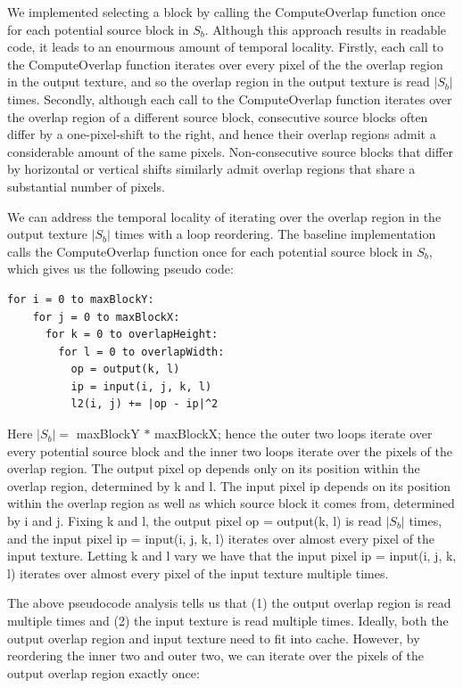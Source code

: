 \documentclass[letterpaper]{article}
\newcommand{\inline}[1]{{\ttfamily\hyphenchar\font=45 #1}}
\begin{document}
We implemented selecting a block by calling the \inline{ComputeOverlap} function once for each potential source block in $S_b$. Although this approach results in readable code, it leads to an enourmous amount of temporal locality. Firstly, each call to the \inline{ComputeOverlap} function iterates over every pixel of the the overlap region in the output texture, and so the overlap region in the output texture is read $|S_b|$ times. Secondly, although each call to the \inline{ComputeOverlap} function iterates over the overlap region of a different source block, consecutive source blocks often differ by a one-pixel-shift to the right, and hence their overlap regions admit a considerable amount of the same pixels. Non-consecutive source blocks that differ by horizontal or vertical shifts similarly admit overlap regions that share a substantial number of pixels.

We can address the temporal locality of iterating over the overlap region in the output texture $|S_b|$ times with a loop reordering. The baseline implementation calls the \inline{ComputeOverlap} function once for each potential source block in $S_b$, which gives us the following pseudo code:

\begin{lstlisting}[style=cppstyle]
  for i = 0 to maxBlockY:
    for j = 0 to maxBlockX:
      for k = 0 to overlapHeight:
        for l = 0 to overlapWidth:
          op = output(k, l)
          ip = input(i, j, k, l)
          l2(i, j) += |op - ip|^2
\end{lstlisting}

Here $|S_b| =$ maxBlockY $ * $ maxBlockX; hence the outer two loops iterate over every potential source block and the inner two loops iterate over the pixels of the overlap region. The output pixel \inline{op} depends only on its position within the overlap region, determined by \inline{k} and \inline{l}. The input pixel \inline{ip} depends on its position within the overlap region as well as which source block it comes from, determined by \inline{i} and \inline{j}. Fixing \inline{k} and \inline{l}, the output pixel \inline{op = output(k, l)} is read $|S_b|$ times, and the input pixel \inline{ip = input(i, j, k, l)} iterates over almost every pixel of the input texture. Letting \inline{k} and \inline{l} vary we have that the input pixel \inline{ip = input(i, j, k, l)} iterates over almost every pixel of the input texture multiple times. 

The above pseudocode analysis tells us that (1) the output overlap region is read multiple times and (2) the input texture is read multiple times. Ideally, both the output overlap region and input texture need to fit into cache. However, by reordering the inner two and outer two, we can iterate over the pixels of the output overlap region exactly once:
\end{document}
